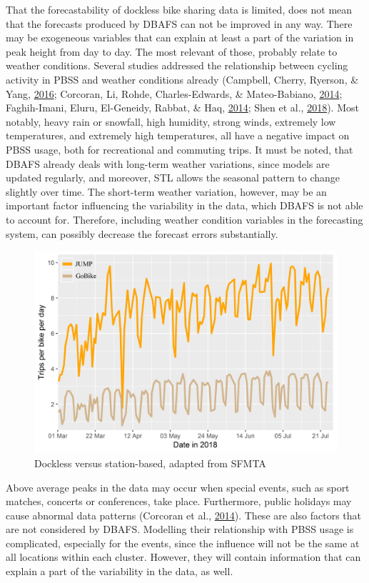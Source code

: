 \documentclass[12pt,oneside]{reedthesis}
\begin{document}
That the forecastability of dockless bike sharing data is limited, does
not mean that the forecasts produced by DBAFS can not be improved in any
way. There may be exogeneous variables that can explain at least a part
of the variation in peak height from day to day. The most relevant of
those, probably relate to weather conditions. Several studies addressed
the relationship between cycling activity in PBSS and weather conditions
already (Campbell, Cherry, Ryerson, \& Yang,
\protect\hyperlink{ref-campbell2016}{2016}; Corcoran, Li, Rohde,
Charles-Edwards, \& Mateo-Babiano,
\protect\hyperlink{ref-corcoran2014}{2014}; Faghih-Imani, Eluru,
El-Geneidy, Rabbat, \& Haq, \protect\hyperlink{ref-faghih2014}{2014};
Shen et al., \protect\hyperlink{ref-shen2018}{2018}). Most notably,
heavy rain or snowfall, high humidity, strong winds, extremely low
temperatures, and extremely high temperatures, all have a negative
impact on PBSS usage, both for recreational and commuting trips. It must
be noted, that DBAFS already deals with long-term weather variations,
since models are updated regularly, and moreover, STL allows the
seasonal pattern to change slightly over time. The short-term weather
variation, however, may be an important factor influencing the
variability in the data, which DBAFS is not able to account for.
Therefore, including weather condition variables in the forecasting
system, can possibly decrease the forecast errors substantially.
\begin{figure}[H]
\includegraphics[width=\textwidth]{Figures/jumpgo} \caption{Dockless versus station-based, adapted from SFMTA}\label{fig:jumpgo}
\end{figure}
Above average peaks in the data may occur when special events, such as
sport matches, concerts or conferences, take place. Furthermore, public
holidays may cause abnormal data patterns (Corcoran et al.,
\protect\hyperlink{ref-corcoran2014}{2014}). These are also factors that
are not considered by DBAFS. Modelling their relationship with PBSS
usage is complicated, especially for the events, since the influence
will not be the same at all locations within each cluster. However, they
will contain information that can explain a part of the variability in
the data, as well.
\end{document}
